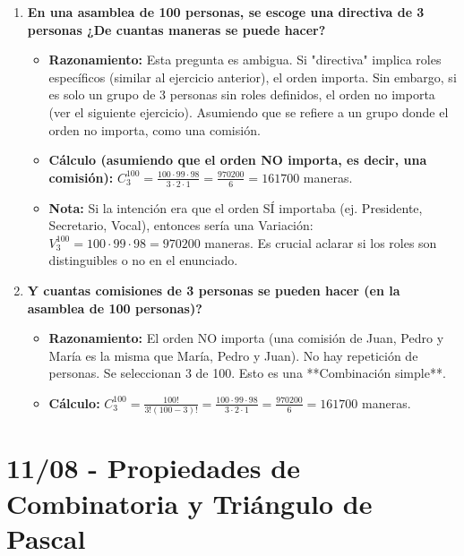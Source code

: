 \documentclass[12pt, letterpaper]{article}
\begin{document}
\begin{enumerate}[leftmargin=*,label=\arabic*.]
    \item \textbf{En una asamblea de 100 personas, se escoge una directiva de 3 personas ¿De cuantas maneras se puede hacer?}
    \begin{itemize}
        \item \textbf{Razonamiento:} Esta pregunta es ambigua. Si "directiva" implica roles específicos (similar al ejercicio anterior), el orden importa. Sin embargo, si es solo un grupo de 3 personas sin roles definidos, el orden no importa (ver el siguiente ejercicio). Asumiendo que se refiere a un grupo donde el orden no importa, como una comisión.
        \item \textbf{Cálculo (asumiendo que el orden NO importa, es decir, una comisión):} $C_3^{100} = \frac{100 \cdot 99 \cdot 98}{3 \cdot 2 \cdot 1} = \frac{970200}{6} = 161700$ maneras.
        \item \textbf{Nota:} Si la intención era que el orden SÍ importaba (ej. Presidente, Secretario, Vocal), entonces sería una Variación: $V_3^{100} = 100 \cdot 99 \cdot 98 = 970200$ maneras. Es crucial aclarar si los roles son distinguibles o no en el enunciado.
    \end{itemize}

    \item \textbf{Y cuantas comisiones de 3 personas se pueden hacer (en la asamblea de 100 personas)?}
    \begin{itemize}
        \item \textbf{Razonamiento:} El orden NO importa (una comisión de Juan, Pedro y María es la misma que María, Pedro y Juan). No hay repetición de personas. Se seleccionan 3 de 100. Esto es una **Combinación simple**.
        \item \textbf{Cálculo:} $C_3^{100} = \frac{100!}{3!(100-3)!} = \frac{100 \cdot 99 \cdot 98}{3 \cdot 2 \cdot 1} = \frac{970200}{6} = 161700$ maneras.
    \end{itemize}
\end{enumerate}

\newpage

\section{11/08 - Propiedades de Combinatoria y Triángulo de Pascal}
\end{document}
